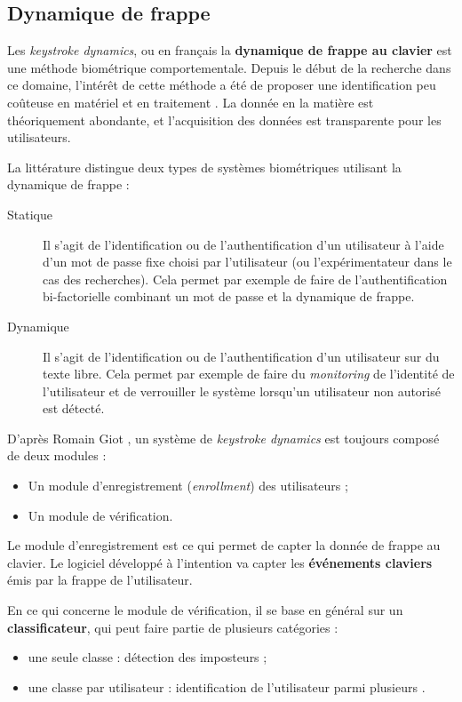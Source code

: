 \subsection{Dynamique de frappe}
\label{subsec:ddf}

Les \textit{keystroke dynamics}, ou en français la \textbf{dynamique de frappe au clavier} est une méthode biométrique comportementale. Depuis le début de la recherche dans ce domaine\cite{rand}, l'intérêt de cette méthode a été de proposer une identification peu coûteuse en matériel et en traitement \cite{monrose1997}. La donnée en la matière est théoriquement abondante, et l'acquisition des données est transparente pour les utilisateurs.

La littérature distingue deux types de systèmes biométriques utilisant la dynamique de frappe :


\begin{description}
  \item[Statique] Il s'agit de l'identification ou de l'authentification d'un utilisateur à l'aide d'un mot de passe fixe choisi par l'utilisateur (ou l'expérimentateur dans le cas des recherches). Cela permet par exemple de faire de l'authentification bi-factorielle combinant un mot de passe et la dynamique de frappe.
  \item[Dynamique] Il s'agit de l'identification ou de l'authentification d'un utilisateur sur du texte libre. Cela permet par exemple de faire du \textit{monitoring} de l'identité de l'utilisateur et de verrouiller le système lorsqu'un utilisateur non autorisé est détecté.
\end{description}

D'après Romain Giot \cite{giotBenchmark}, un système de \textit{keystroke dynamics} est toujours composé de deux modules :

\begin{itemize}
	\item Un module d'enregistrement (\textit{enrollment}) des utilisateurs ;
	\item Un module de vérification.
\end{itemize}

Le module d'enregistrement est ce qui permet de capter la donnée de frappe au clavier. Le logiciel développé à l'intention va capter les \textbf{événements claviers} émis par la frappe de l'utilisateur.

En ce qui concerne le module de vérification, il se base en général sur un \textbf{classificateur}, qui peut faire partie de plusieurs catégories : 

\begin{itemize}
	\item une seule classe : détection des imposteurs \cite{killourhy2009};
	\item une classe par utilisateur : identification de l'utilisateur parmi plusieurs \cite{monrose1997}.
\end{itemize}

